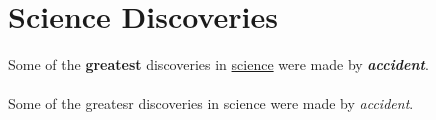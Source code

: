 \documentclass{article}
\begin{document}
	\section{Science Discoveries}
	Some of the \textbf{greatest}
	discoveries in \underline{science}
	were made by
	\textbf{\textit{accident}}.
	
	\paragraph{}
	Some of the greatesr discoveries in science were made by \emph{accident}.
\end{document}
